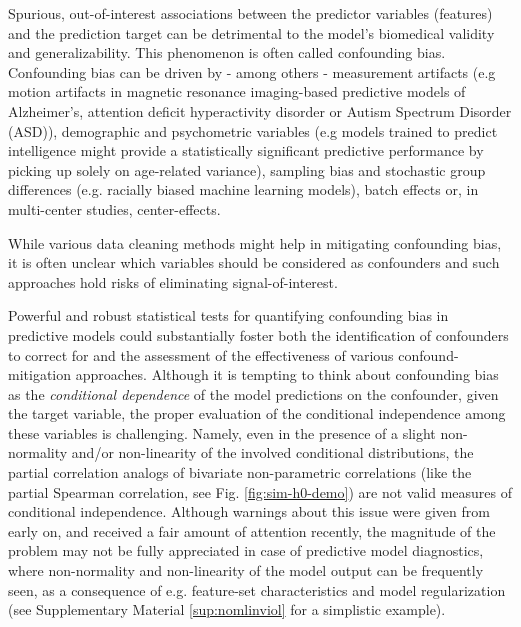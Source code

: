 \documentclass{article}
\begin{document}
Spurious, out-of-interest associations between the predictor variables (features) and the prediction target can be detrimental to the model's biomedical validity and generalizability. This phenomenon is often called confounding bias\citep{prosperi2020causal}. Confounding bias can be driven by - among others - measurement artifacts (e.g motion artifacts in magnetic resonance imaging-based predictive models of Alzheimer's\citep{rao2017predictive}, attention deficit hyperactivity disorder\citep{eloyan2012automated, couvy2016head} or Autism Spectrum Disorder (ASD)\citep{gotts2013perils, spisak2014voxel, spisak2019optimal}), demographic and psychometric variables (e.g models trained to predict intelligence\citep{ cole2012global, he2020deep} might provide a statistically significant predictive performance by picking up solely on age-related variance\citep{dubois2018distributed, lohmann2021predicting}), sampling bias and stochastic group differences (e.g. racially biased machine learning models\citep{ obermeyer2019dissecting, lwowski2021risk}), batch effects or, in multi-center studies, center-effects.

While various data cleaning methods might help in mitigating confounding bias\citep{rao2017predictive, dukart2011age, spisak2014voxel, abdulkadir2014reduction, johnson2007adjusting}, it is often unclear which variables should be considered as confounders and such approaches hold risks of eliminating signal-of-interest\citep{wachinger2021detect}.

Powerful and robust statistical tests for quantifying confounding bias in predictive models could substantially foster both the identification of confounders to correct for and the assessment of the effectiveness of various confound-mitigation approaches. Although it is tempting to think about confounding bias as the \emph{conditional dependence} of the model predictions on the confounder, given the target variable, the proper evaluation of the conditional independence among these variables is challenging. Namely, even in the presence of a slight non-normality and/or non-linearity of the involved conditional distributions, the partial correlation analogs of bivariate non-parametric correlations (like the partial Spearman correlation, see Fig. \ref{fig:sim-h0-demo}) are not valid measures of conditional independence. Although warnings about this issue were given from early on\citep{korn1984ranges}, and received a fair amount of attention recently\citep{bergsma2010nonparametric, candes2016panning, peters2016causal,  shah2020hardness, berrett2020conditional}, the magnitude of the problem may not be fully appreciated in case of predictive model diagnostics, where non-normality and non-linearity of the model output can be frequently seen, as a consequence of e.g. feature-set characteristics and model regularization\citep{garcia2009study, kristensen2017whole} (see Supplementary Material \ref{sup:nomlinviol} for a simplistic example).
\end{document}
